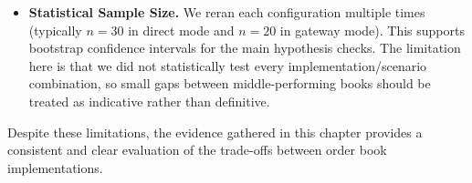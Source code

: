 \begin{itemize}
    \item \textbf{Statistical Sample Size.}
        We reran each configuration multiple times (typically $n=30$ in direct
        mode and $n=20$ in gateway mode). This supports bootstrap confidence intervals for
        the main hypothesis checks. The limitation here is that we did not
        statistically test every implementation/scenario combination, so small
        gaps between middle-performing books should be
        treated as indicative rather than definitive.
\end{itemize}

Despite these limitations, the evidence gathered in this chapter provides a 
consistent and clear evaluation of the trade-offs between order book 
implementations.

